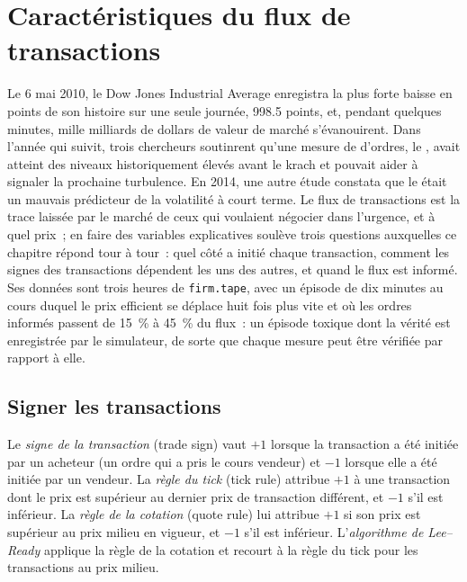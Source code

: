 \chapter{Caractéristiques du flux de transactions}\label{ch:rs:trade-flow-features}

Le 6 mai 2010, le Dow Jones Industrial Average enregistra la plus forte baisse en points de son histoire sur une seule journée, 998.5 points, et, pendant quelques
minutes, mille milliards de dollars de valeur de marché s'évanouirent. Dans l'année qui suivit, trois chercheurs soutinrent qu'une mesure de  d'ordres, le ,
avait atteint des niveaux historiquement élevés avant le krach et pouvait aider à signaler la prochaine turbulence. En 2014, une autre étude constata que le  était un mauvais
prédicteur de la volatilité à court terme. Le flux de transactions est la trace laissée par le marché de ceux qui voulaient négocier dans l'urgence, et à quel prix~; en faire des
variables explicatives soulève trois questions auxquelles ce chapitre répond tour à tour~: quel côté a initié chaque transaction, comment les signes des transactions dépendent
les uns des autres, et quand le flux est informé. Ses données sont trois heures de \texttt{firm.tape}, avec un épisode de dix minutes au cours duquel le
prix efficient se déplace huit fois plus vite et où les ordres informés passent de 15~\% à 45~\% du flux~: un épisode toxique dont la vérité est enregistrée par le
simulateur, de sorte que chaque mesure peut être vérifiée par rapport à elle.

\section{Signer les transactions}

\begin{definition}\label{def:rs:trade-flow-features:sign}
Le \emph{signe de la transaction} (trade sign) vaut $+1$ lorsque la transaction a été initiée par un acheteur (un ordre qui a pris le cours vendeur) et $-1$ lorsque
elle a été initiée par un vendeur. La \emph{règle du tick} (tick rule) attribue $+1$ à une transaction dont le prix est supérieur au dernier prix de transaction
différent, et $-1$ s'il est inférieur. La \emph{règle de la cotation} (quote rule) lui attribue $+1$ si son prix est supérieur au prix milieu en vigueur, et $-1$
s'il est inférieur. L'\emph{algorithme de Lee--Ready} applique la règle de la cotation et recourt à la règle du tick
pour les transactions au prix milieu.
\end{definition}

